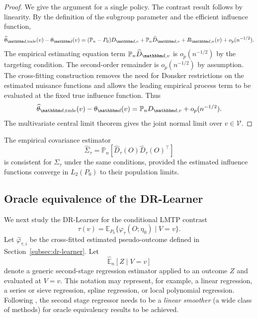 \documentclass[11pt]{article}
\begin{document}
\begin{proof}
We give the argument for a single policy. The contrast result follows by
linearity. By the definition of the subgroup parameter and the efficient
influence function,
\[
  \widehat\theta_{\mathbbm d,\mathrm{tmle}}(v)
  -
  \theta_{\mathbbm d}(v)
  =
  (\mathbb{P}_n-P_0)D_{\mathbbm d,v}
  +
  \mathbb{P}_n
  \widehat D_{\mathbbm d,v}
  +
  R_{\mathbbm d,n}(v)
  +
  o_p(n^{-1/2}).
\]
The empirical estimating equation term
\(\mathbb{P}_n\widehat D_{\mathbbm d,v}\) is \(o_p(n^{-1/2})\) by the targeting
condition. The second-order remainder is \(o_p(n^{-1/2})\) by assumption. The
cross-fitting construction removes the need for Donsker restrictions on the
estimated nuisance functions and allows the leading empirical process term to be
evaluated at the fixed true influence function. Thus
\[
  \widehat\theta_{\mathbbm d,\mathrm{tmle}}(v)
  -
  \theta_{\mathbbm d}(v)
  =
  \mathbb{P}_nD_{\mathbbm d,v}
  +
  o_p(n^{-1/2}).
\]
The multivariate central limit theorem gives the joint normal limit over
\(v\in\mathcal V\).
\end{proof}

\begin{remark}
The empirical covariance estimator
\[
  \widehat\Sigma_{\tau}
  =
  \mathbb{P}_n
  \left[
    \widehat D_{\tau}(O)
    \widehat D_{\tau}(O)^\top
  \right]
\]
is consistent for \(\Sigma_\tau\) under the same conditions, provided the
estimated influence functions converge in \(L_2(P_0)\) to their population
limits.
\end{remark}

\subsection{Oracle equivalence of the DR-Learner}
\label{subsec:theory-dr-learner}

We next study the DR-Learner for the conditional LMTP contrast
\[
  \tau(v)
  =
  \mathbb{E}_{P_0}
  \{\varphi_\tau(O;\eta_0)\mid V=v\}.
\]
Let \(\widehat\varphi_{\tau,i}\) be the cross-fitted estimated pseudo-outcome
defined in Section~\ref{subsec:dr-learner}. Let
\[
  \widehat{\mathbb E}_n[Z\mid V=v]
\]
denote a generic second-stage regression estimator applied to an outcome
\(Z\) and evaluated at \(V=v\). This notation may represent, for example, a linear regression,
a series or sieve regression, spline regression, or local polynomial regression. 
Following \cite{kennedyOptimalDoublyRobust2023a}, the second stage regressor
needs to be a \textit{linear smoother} (a wide class of methods) for oracle equivalency
results to be achieved.
\end{document}

